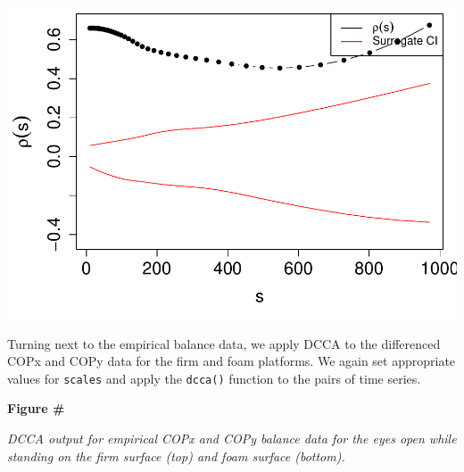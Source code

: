 \documentclass[
  man]{apa6}
\begin{document}
\includegraphics{fractal_regression_paper_brm_files/figure-latex/unnamed-chunk-19-1.pdf}

Turning next to the empirical balance data, we apply DCCA to the
differenced COPx and COPy data for the firm and foam platforms. We again
set appropriate values for \texttt{scales} and apply the \texttt{dcca()} function to
the pairs of time series.

\textbf{Figure \#}

\emph{DCCA output for empirical COPx and COPy balance data for the eyes open
while standing on the firm surface (top) and foam surface (bottom).}
\end{document}
